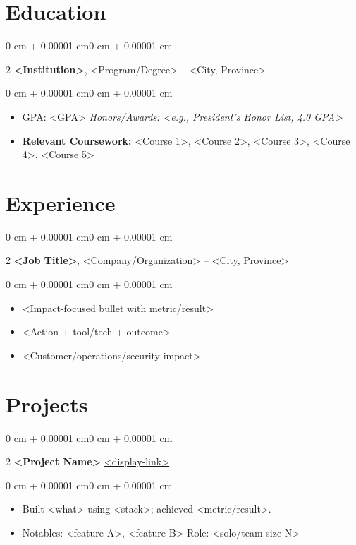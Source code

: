 \documentclass[10pt, letterpaper]{article}
\newenvironment{highlights}{\begin{itemize}[topsep=0.10 cm,parsep=0.10 cm,partopsep=0pt,itemsep=0pt,leftmargin=0 cm + 10pt]}{\end{itemize}}
\newenvironment{onecolentry}{\begin{adjustwidth}{0 cm + 0.00001 cm}{0 cm + 0.00001 cm}}{\end{adjustwidth}}
\newenvironment{twocolentry}[2][]{\onecolentry\def\secondColumn{#2}\setcolumnwidth{\fill, 4.5 cm}\begin{paracol}{2}}{\switchcolumn \raggedleft \secondColumn\end{paracol}\endonecolentry}
\begin{document}
\section{Education}
\begin{twocolentry}{<Start Mon YYYY -- End Mon YYYY or Present>}
    \textbf{<Institution>}, <Program/Degree> -- <City, Province>
\end{twocolentry}
\vspace{0.10 cm}
\begin{onecolentry}
    \begin{highlights}
        \item GPA: <GPA> \hfill \textit{Honors/Awards: <e.g., President's Honor List, 4.0 GPA>}
        \item \textbf{Relevant Coursework:} <Course 1>, <Course 2>, <Course 3>, <Course 4>, <Course 5>
    \end{highlights}
\end{onecolentry}

\section{Experience}
\begin{twocolentry}{<Start Mon YYYY -- End Mon YYYY>}
    \textbf{<Job Title>}, <Company/Organization> -- <City, Province>
\end{twocolentry}
\vspace{0.10 cm}
\begin{onecolentry}
    \begin{highlights}
        \item <Impact-focused bullet with metric/result>
        \item <Action + tool/tech + outcome>
        \item <Customer/operations/security impact>
    \end{highlights}
\end{onecolentry}

\section{Projects}
\begin{twocolentry}{\href{<REPO_OR_LIVE_LINK>}{<display-link>}}
    \textbf{<Project Name>}
\end{twocolentry}
\vspace{0.10 cm}
\begin{onecolentry}
    \begin{highlights}
        \item Built <what> using <stack>; achieved <metric/result>.
        \item Notables: <feature A>, <feature B> \textbar{} Role: <solo/team size N>
    \end{highlights}
\end{onecolentry}
\end{document}
